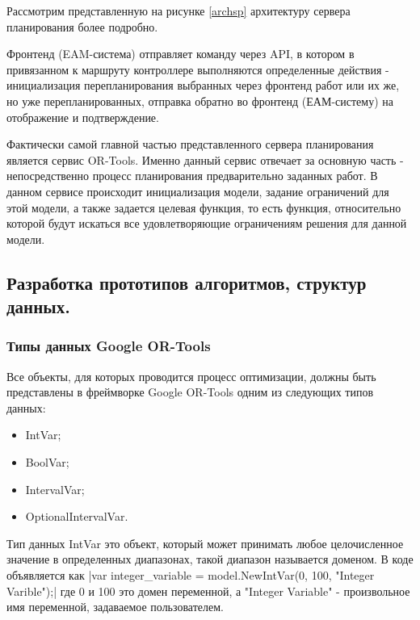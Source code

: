 
Рассмотрим представленную на рисунке \ref{archsp} архитектуру сервера планирования более подробно.

Фронтенд (EAM-система) отправляет команду через API, в котором в привязанном к маршруту контроллере выполняются определенные действия - инициализация перепланирования выбранных через фронтенд работ или их же, но уже перепланированных, отправка обратно во фронтенд (ЕАМ-систему) на отображение и подтверждение.

Фактически самой главной частью представленного сервера планирования является сервис OR-Tools. Именно данный сервис отвечает за основную часть - непосредственно процесс планирования предварительно заданных работ. В данном сервисе происходит инициализация модели, задание ограничений для этой модели, а также задается целевая функция, то есть функция, относительно которой будут искаться все удовлетворяющие ограничениям решения для данной модели.


\subsection{Разработка прототипов алгоритмов, структур данных.}

\subsubsection{Типы данных Google OR-Tools}

Все объекты, для которых проводится процесс оптимизации, должны быть представлены в фреймворке Google OR-Tools одним из следующих типов данных:

\begin{itemize}
	\item IntVar; 
	\item BoolVar;
	\item IntervalVar;
	\item OptionalIntervalVar.
\end{itemize}

Тип данных IntVar это объект, который может принимать любое целочисленное значение в определенных диапазонах, такой диапазон называется доменом. В коде объявляется как
|var integer_variable = model.NewIntVar(0, 100, "Integer Varible");|
где 0 и 100 это домен переменной, а "Integer Variable" - произвольное имя переменной, задаваемое пользователем.

